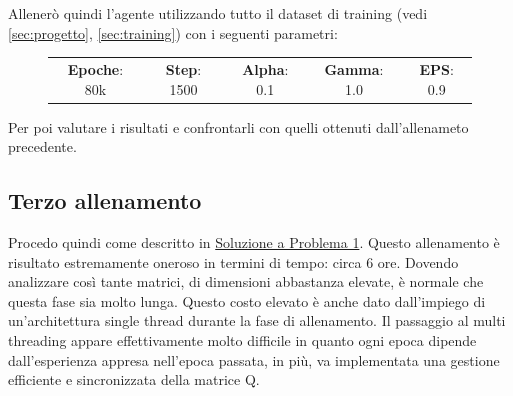 Allener\`{o} quindi l'agente utilizzando tutto il dataset di training (vedi \autoref{sec:progetto}, \autoref{sec:training}) con i seguenti parametri:

\begin{figure}[H]
	\centering
	\begin{tabular}{c | c | c | c | c}
		\textbf{Epoche}: 80k & \textbf{Step}: 1500 & \textbf{Alpha}: 0.1 & \textbf{Gamma}: 1.0 & \textbf{EPS}: 0.9\\
	\end{tabular}
\end{figure}

Per poi valutare i risultati e confrontarli con quelli ottenuti dall'allenameto precedente.

\subsection{Terzo allenamento}
\label{sec:terzo}

 Procedo quindi come descritto in \hyperref[sec:solprob11]{Soluzione a Problema 1}. Questo allenamento \`{e} risultato estremamente oneroso in termini di tempo: circa 6 ore. Dovendo analizzare cos\`{i} tante matrici, di dimensioni abbastanza elevate, \`{e} normale che questa fase sia molto lunga. Questo costo elevato \`{e} anche dato dall'impiego di un'architettura single thread durante la fase di allenamento. Il passaggio al multi threading appare effettivamente molto difficile in quanto ogni epoca dipende dall'esperienza appresa nell'epoca passata, in pi\`{u}, va implementata una gestione efficiente e sincronizzata della matrice Q.

